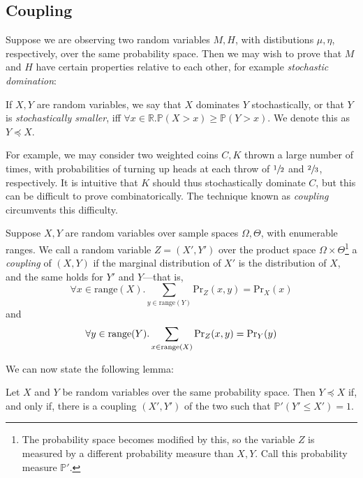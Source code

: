 	\subsection{Coupling}
	Suppose we
	are observing two random variables $M, H$, with distibutions $\mu, \eta$, respectively, over
	the same probability space. Then we may wish to prove that $M$ and $H$ have certain properties 
	relative to each other, for example \emph{stochastic domination}:
	\begin{definition}
		If $X, Y$ are random variables, we say that $X$ dominates $Y$ stochastically, or that
		$Y$ is \emph{stochastically smaller}, iff $\forall x \in \mathbb{R}. \mathbb{P}(X>x)
		\geq \mathbb{P}(Y > x)$. We denote this as $Y \preccurlyeq X$. 
	\end{definition}

	For example, we may consider two weighted coins $C, K$ thrown a large number of times, 
	with probabilities of turning up heads at each throw of $\sfrac{1}{2}$ and $\sfrac{2}{3}$, 
	respectively. It is intuitive that $K$ should 
	thus stochastically dominate $C$, but this can be difficult to prove combinatorically. The
	technique known as \emph{coupling} circumvents this difficulty. 
	\begin{definition}
		Suppose $X,Y$ are random variables over sample spaces $\Omega, \Theta$, with 
		enumerable ranges. We call a random variable $Z = (X', Y')$ over the product space 
		$\Omega \times \Theta$\footnote{The probability space becomes modified by this, so 
		the variable $Z$ is measured by a different probability measure than $X,Y$. Call 
		this probability measure $\mathbb{P}'$.} a \emph{coupling} of $(X, Y)$ if the 
		marginal distribution of $X'$ is the distribution 
		of $X$, and the same holds for $Y'$ and $Y$---that is,
		$$
			\forall x \in \mathrm{range}(X).
			\sum_{y \in \mathrm{range}(Y)} \mathrm{Pr}_Z(x, y) = \mathrm{Pr}_X(x)
		$$
		and
		$$
			\forall y \in \mathrm{range}(Y).
			\sum_{x \in\\ \mathrm{range}(X)} \mathrm{Pr}_Z(x, y) = \mathrm{Pr}_Y(y)
		$$
	\end{definition}

	We can now state the following lemma:
	\begin{lemma}
		\label{lemma:stochdomcoup}
		Let $X$ and $Y$ be random variables over the same probability space. Then
		$Y \preccurlyeq X$ if, and only if, there is a coupling $(X', Y')$ of the two such
		that $\mathbb{P}'(Y' \leq X') = 1$.
	\end{lemma}
	\begin{comment}
		We will not prove this lemma in completeness; luckily the interesting direction
		for us is fairly easy to see: If such a coupling exists, then 
		\begin{align*}
			\mathbb{P}(x < Y) &= \mathbb{P}'(x < Y') \\
			&= \mathbb{P}'(x < Y'\land Y'\leq X') \\
			&\leq \mathbb{P}'(x < X') \\
			&= \mathbb{P}(x < X)
		\end{align*}
	\end{comment}

